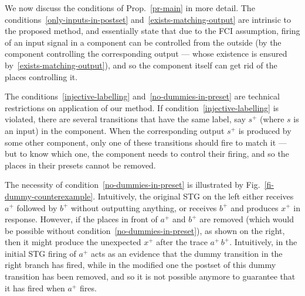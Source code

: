 We now discuss the conditions of Prop.~\ref{pr-main} in more
detail. The conditions~\ref{only-inputs-in-postset}
and~\ref{exists-matching-output} are intrinsic to the proposed
method, and essentially state that due to the FCI assumption,
firing of an input signal in a component can be controlled from
the outside (\viz by the component controlling the
corresponding output --- whose existence is ensured
by~\ref{exists-matching-output}), and so the component itself
can get rid of the places controlling it.

The conditions~\ref{injective-labelling}
and~\ref{no-dummies-in-preset} are technical restrictions on
application of our method. If
condition~\ref{injective-labelling} is violated, there are
several transitions that have the same label, say $s^+$ (where
$s$ is an input) in the component. When the corresponding
output $s^+$ is produced by some other component, only one of
these transitions should fire to match it --- but to know which
one, the component needs to control their firing, and so the
places in their presets cannot be removed.

The necessity of condition~\ref{no-dummies-in-preset} is
illustrated by Fig.~\ref{fi-dummy-counterexample}. Intuitively,
the original STG on the left either receives $a^+$ followed by
$b^+$ without outputting anything, or receives $b^+$ and
produces $x^+$ in response. However, if the places in front of
$a^+$ and $b^+$ are removed (which would be possible without
condition~\ref{no-dummies-in-preset}), as shown on the right,
then it might produce the unexpected $x^+$ after the trace
$a^+\,b^+$. Intuitively, in the initial STG firing of $a^+$
acts as an evidence that the dummy transition in the right
branch has fired, while in the modified one the postset of this
dummy transition has been removed, and so it is not possible
anymore to guarantee that it has fired when $a^+$ fires.

